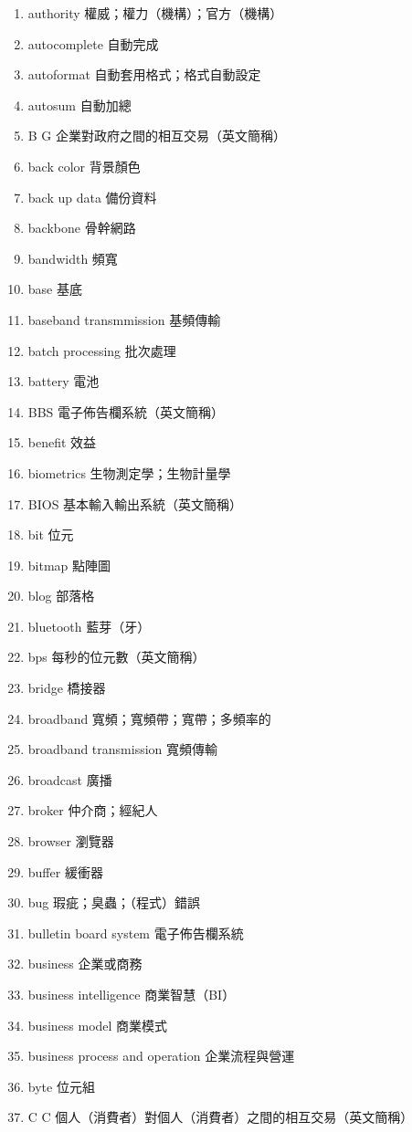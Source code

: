\begin{enumerate}
  \item authority 權威；權力（機構）；官方（機構）
  \item autocomplete 自動完成
  \item autoformat 自動套用格式；格式自動設定
  \item autosum 自動加總
  \item B G 企業對政府之間的相互交易（英文簡稱）
  \item back color 背景顏色
  \item back up data 備份資料
  \item backbone 骨幹網路
  \item bandwidth 頻寬
  \item base 基底
  \item baseband transmmission 基頻傳輸
  \item batch processing 批次處理
  \item battery 電池
  \item BBS 電子佈告欄系統（英文簡稱）
  \item benefit 效益
  \item biometrics 生物測定學；生物計量學
  \item BIOS 基本輸入輸出系統（英文簡稱）
  \item bit 位元
  \item bitmap 點陣圖
  \item blog 部落格
  \item bluetooth 藍芽（牙）
  \item bps 每秒的位元數（英文簡稱）
  \item bridge 橋接器
  \item broadband 寬頻；寬頻帶；寬帶；多頻率的
  \item broadband transmission 寬頻傳輸
  \item broadcast 廣播
  \item broker 仲介商；經紀人
  \item browser 瀏覽器
  \item buffer 緩衝器
  \item bug 瑕疵；臭蟲；（程式）錯誤
  \item bulletin board system 電子佈告欄系統
  \item business 企業或商務
  \item business intelligence 商業智慧（BI）
  \item business model 商業模式
  \item business process and operation 企業流程與營運
  \item byte 位元組
  \item C C 個人（消費者）對個人（消費者）之間的相互交易（英文簡稱）

\end{enumerate}
